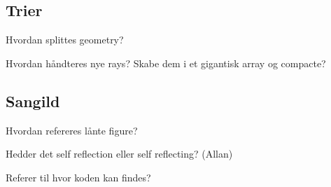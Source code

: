 \subsection*{Trier}

Hvordan splittes geometry?

Hvordan håndteres nye rays? Skabe dem i et gigantisk array og
compacte?

\subsection*{Sangild}

Hvordan refereres lånte figure?

Hedder det self reflection eller self reflecting? (Allan)

Referer til hvor koden kan findes?
